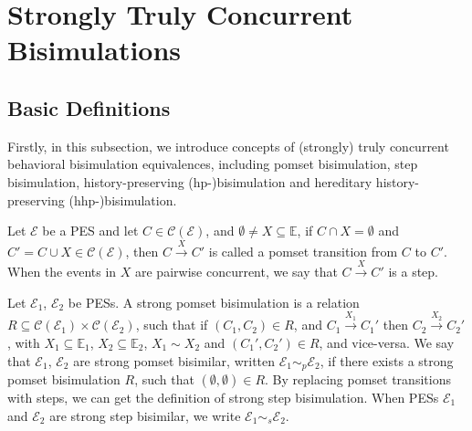 \section{Strongly Truly Concurrent Bisimulations}\label{stcb}

\subsection{Basic Definitions}\label{STCC}

Firstly, in this subsection, we introduce concepts of (strongly) truly concurrent behavioral bisimulation equivalences, including pomset bisimulation, step bisimulation, history-preserving (hp-)bisimulation and hereditary history-preserving (hhp-)bisimulation.

\begin{definition}
Let $\mathcal{E}$ be a PES and let $C\in\mathcal{C}(\mathcal{E})$, and $\emptyset\neq X\subseteq \mathbb{E}$, if $C\cap X=\emptyset$ and $C'=C\cup X\in\mathcal{C}(\mathcal{E})$, then $C\xrightarrow{X} C'$ is called a pomset transition from $C$ to $C'$. When the events in $X$ are pairwise concurrent, we say that $C\xrightarrow{X}C'$ is a step.
\end{definition}

\begin{definition}\label{PSB}
Let $\mathcal{E}_1$, $\mathcal{E}_2$ be PESs. A strong pomset bisimulation is a relation $R\subseteq\mathcal{C}(\mathcal{E}_1)\times\mathcal{C}(\mathcal{E}_2)$, such that if $(C_1,C_2)\in R$, and $C_1\xrightarrow{X_1}C_1'$ then $C_2\xrightarrow{X_2}C_2'$, with $X_1\subseteq \mathbb{E}_1$, $X_2\subseteq \mathbb{E}_2$, $X_1\sim X_2$ and $(C_1',C_2')\in R$, and vice-versa. We say that $\mathcal{E}_1$, $\mathcal{E}_2$ are strong pomset bisimilar, written $\mathcal{E}_1\sim_p\mathcal{E}_2$, if there exists a strong pomset bisimulation $R$, such that $(\emptyset,\emptyset)\in R$. By replacing pomset transitions with steps, we can get the definition of strong step bisimulation. When PESs $\mathcal{E}_1$ and $\mathcal{E}_2$ are strong step bisimilar, we write $\mathcal{E}_1\sim_s\mathcal{E}_2$.
\end{definition}

